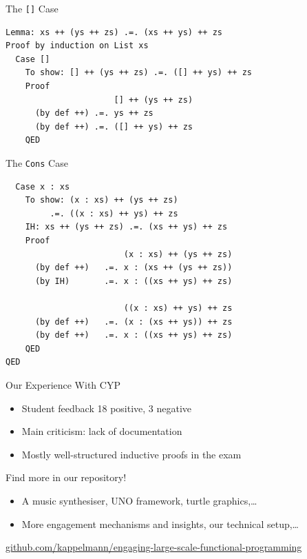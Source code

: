 \documentclass{beamer}
\begin{document}
\begin{frame}[fragile]{The \texttt{[]} Case}
  \begin{lstlisting}
Lemma: xs ++ (ys ++ zs) .=. (xs ++ ys) ++ zs
Proof by induction on List xs
  Case []
    To show: [] ++ (ys ++ zs) .=. ([] ++ ys) ++ zs
    Proof
                      [] ++ (ys ++ zs)
      (by def ++) .=. ys ++ zs
      (by def ++) .=. ([] ++ ys) ++ zs
    QED
  \end{lstlisting}
\end{frame}

\begin{frame}[fragile]{The \texttt{Cons} Case}
  \begin{lstlisting}
  Case x : xs
    To show: (x : xs) ++ (ys ++ zs)
         .=. ((x : xs) ++ ys) ++ zs
    IH: xs ++ (ys ++ zs) .=. (xs ++ ys) ++ zs
    Proof
                        (x : xs) ++ (ys ++ zs)
      (by def ++)   .=. x : (xs ++ (ys ++ zs))
      (by IH)       .=. x : ((xs ++ ys) ++ zs)

                        ((x : xs) ++ ys) ++ zs
      (by def ++)   .=. (x : (xs ++ ys)) ++ zs
      (by def ++)   .=. x : ((xs ++ ys) ++ zs)
    QED
QED
  \end{lstlisting}
\end{frame}

\begin{frame}{Our Experience With CYP}
\begin{itemize}[<+->]
  \item Student feedback 18 positive, 3 negative
  \item Main criticism: lack of documentation
  \item Mostly well-structured inductive proofs in the exam
\end{itemize}
\end{frame}


\begin{frame}
\centerline{\alert{\huge{Find more in our repository!}}}
\begin{itemize}
\item A music synthesiser, UNO framework, turtle graphics,\dots
\item More engagement mechanisms and insights, our technical setup,\dots
\end{itemize}

\vspace{\baselineskip}
\centerline{\small\url{github.com/kappelmann/engaging-large-scale-functional-programming}}
\end{frame}
\end{document}
